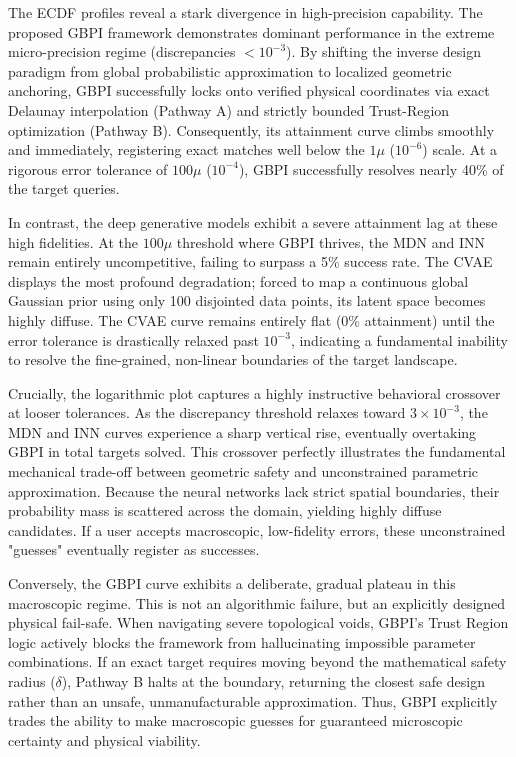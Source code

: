 The ECDF profiles reveal a stark divergence in high-precision capability. The proposed GBPI framework demonstrates dominant performance in the extreme micro-precision regime (discrepancies $< 10^{-3}$). By shifting the inverse design paradigm from global probabilistic approximation to localized geometric anchoring, GBPI successfully locks onto verified physical coordinates via exact Delaunay interpolation (Pathway A) and strictly bounded Trust-Region optimization (Pathway B). Consequently, its attainment curve climbs smoothly and immediately, registering exact matches well below the $1\mu$ ($10^{-6}$) scale. At a rigorous error tolerance of $100\mu$ ($10^{-4}$), GBPI successfully resolves nearly 40\% of the target queries.

In contrast, the deep generative models exhibit a severe attainment lag at these high fidelities. At the $100\mu$ threshold where GBPI thrives, the MDN and INN remain entirely uncompetitive, failing to surpass a 5\% success rate. The CVAE displays the most profound degradation; forced to map a continuous global Gaussian prior using only 100 disjointed data points, its latent space becomes highly diffuse. The CVAE curve remains entirely flat (0\% attainment) until the error tolerance is drastically relaxed past $10^{-3}$, indicating a fundamental inability to resolve the fine-grained, non-linear boundaries of the target landscape.

Crucially, the logarithmic plot captures a highly instructive behavioral crossover at looser tolerances. As the discrepancy threshold relaxes toward $3 \times 10^{-3}$, the MDN and INN curves experience a sharp vertical rise, eventually overtaking GBPI in total targets solved. This crossover perfectly illustrates the fundamental mechanical trade-off between geometric safety and unconstrained parametric approximation. Because the neural networks lack strict spatial boundaries, their probability mass is scattered across the domain, yielding highly diffuse candidates. If a user accepts macroscopic, low-fidelity errors, these unconstrained "guesses" eventually register as successes. 

Conversely, the GBPI curve exhibits a deliberate, gradual plateau in this macroscopic regime. This is not an algorithmic failure, but an explicitly designed physical fail-safe. When navigating severe topological voids, GBPI's Trust Region logic actively blocks the framework from hallucinating impossible parameter combinations. If an exact target requires moving beyond the mathematical safety radius ($\delta$), Pathway B halts at the boundary, returning the closest safe design rather than an unsafe, unmanufacturable approximation. Thus, GBPI explicitly trades the ability to make macroscopic guesses for guaranteed microscopic certainty and physical viability.


